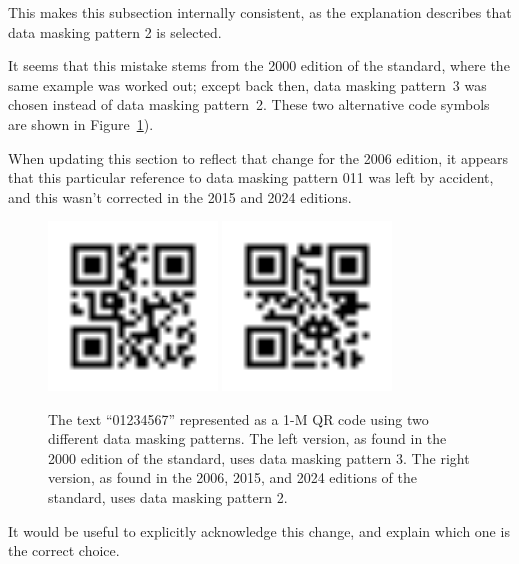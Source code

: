 \documentclass[a4paper,twoside]{article}
\begin{document}
This makes this subsection internally consistent, as the explanation describes that data masking pattern 2 is selected.

It seems that this mistake stems from the 2000 edition of the standard, where the same example was worked out;
except back then, data masking pattern~3 was chosen instead of data masking pattern~2.
These two alternative code symbols are shown in Figure~\ref{fig:dmp-changed-2}).

When updating this section to reflect that change for the 2006 edition, it appears that this particular reference
to data masking pattern 011 was left by accident, and this wasn't corrected in the 2015 and 2024 editions.

\begin{figure}[h!]
\centering
\includegraphics[width=0.4\textwidth]{images/qrcode_iso18004_2000_AnnexG_1Mp3.png}
\includegraphics[width=0.4\textwidth]{images/qrcode_iso18004_2006_2015_2024_AnnexI_1Mp2.png}
\caption{The text ``01234567'' represented as a 1-M QR code using two different data masking patterns.
         The left version, as found in the 2000 edition of the standard, uses data masking pattern 3.
         The right version, as found in the 2006, 2015, and 2024 editions of the standard, uses data masking pattern 2.}
\label{fig:dmp-changed-2}
\end{figure}

It would be useful to explicitly acknowledge this change, and explain which one is the correct choice.
\end{document}

